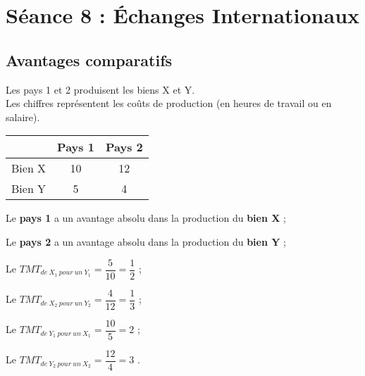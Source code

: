 \section{Séance 8 : Échanges Internationaux}




\subsection{Avantages comparatifs}



Les pays 1 et 2 produisent les biens X et Y.\\
Les chiffres représentent les coûts de production (en heures de travail ou en salaire).
\begin{center}
	\begin{tabular}{|c|c|c|}
		\hline
		       & Pays 1 & Pays 2\\\hline
		Bien X & 10     & 12    \\\hline
		Bien Y & 5      & 4    \\\hline
	\end{tabular}
\end{center}

\begin{description}
	\item Le \textbf{pays 1} a un avantage absolu dans la production du \textbf{bien X} ;
	\item Le \textbf{pays 2} a un avantage absolu dans la production du \textbf{bien Y} ;
	\item Le \textbf{$TMT_{de\ X_1\ pour\ un\ Y_1} = \dfrac{5}{10} = \dfrac{1}{2}$ } ;
    \item Le \textbf{$TMT_{de\ X_2\ pour\ un\ Y_2} = \dfrac{4}{12} = \dfrac{1}{3}$ } ;
    \item Le \textbf{$TMT_{de\ Y_1\ pour\ un\ X_1} = \dfrac{10}{5} = 2$ } ;
    \item Le \textbf{$TMT_{de\ Y_2\ pour\ un\ X_2} = \dfrac{12}{4} = 3$ }.
\end{description}